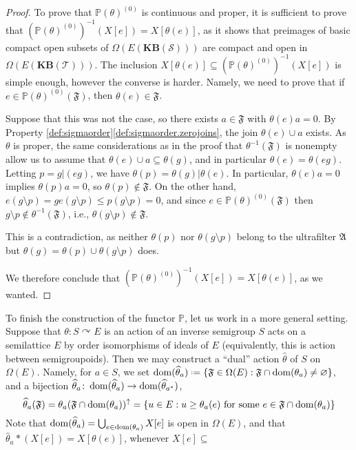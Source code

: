 \begin{proof}
    To prove that $\mathbb{P}(\theta)^{(0)}$ is continuous and proper, it is sufficient to prove that $\left(\mathbb{P}(\theta)^{(0)}\right)^{-1}(X[e])=X[\theta(e)]$, as it shows that preimages of basic compact open subsets of $\Omega(E(\mathbf{KB}(\mathcal{S})))$ are compact and open in $\Omega(E(\mathbf{KB}(\mathcal{T})))$. The inclusion $X[\theta(e)]\subseteq\left(\mathbb{P}(\theta)^{(0)}\right)^{-1}(X[e])$ is simple enough, however the converse is harder. Namely, we need to prove that if $e\in\mathbb{P}(\theta)^{(0)}(\mathfrak{F})$, then $\theta(e)\in\mathfrak{F}$.
    
    Suppose that this was not the case, so there exists $a\in\mathfrak{F}$ with $\theta(e)a=0$. By Property \ref{def:sigmaorder}\ref{def:sigmaorder.zerojoins}, the join $\theta(e)\cup a$ exists. As $\theta$ is proper, the same considerations as in the proof that $\theta^{-1}(\mathfrak{F})$ is nonempty allow us to assume that $\theta(e)\cup a\subseteq\theta(g)$, and in particular $\theta(e)=\theta(eg)$. Letting $p=g|(eg)$, we have $\theta(p)=\theta(g)|\theta(e)$. In particular, $\theta(e)a=0$ implies $\theta(p)a=0$, so $\theta(p)\not\in\mathfrak{F}$. On the other hand, $e(g\setminus p)=ge(g\setminus p)\leq p(g\setminus p)=0$, and since $e\in\mathbb{P}(\theta)^{(0)}(\mathfrak{F})$ then $g\setminus p\not\in\theta^{-1}(\mathfrak{F})$, i.e., $\theta(g\setminus p)\not\in\mathfrak{F}$.
    
    This is a contradiction, as neither $\theta(p)$ nor $\theta(g\setminus p)$ belong to the ultrafilter $\mathfrak{A}$ but $\theta(g)=\theta(p)\cup\theta(g\setminus p)$ does.
    
    We therefore conclude that $\left(\mathbb{P}(\theta)^{(0)}\right)^{-1}(X[e])=X[\theta(e)]$, as we wanted.\qedhere
\end{proof}

To finish the construction of the functor $\mathbb{P}$, let us work in a more general setting. Suppose that $\theta\colon S\curvearrowright E$ is an action of an inverse semigroup $S$ acts on a semilattice $E$ by order isomorphisms of ideals of $E$ (equivalently, this is action between semigroupoids). Then we may construct a ``dual'' action $\widehat{\theta}$ of $S$ on $\Omega(E)$. Namely, for $a\in S$, we set $\dom(\widehat{\theta}_a)\defeq\left\{\mathfrak{F}\in\Omega(E):\mathfrak{F}\cap\dom(\theta_a)\neq\varnothing\right\}$, and a bijection $\widehat{\theta}_a\colon\operatorname{dom}(\widehat{\theta}_a)\to\operatorname{dom}(\widehat{\theta}_{a^*})$, \[\widehat{\theta}_a(\mathfrak{F})=\theta_a(\mathfrak{F}\cap\operatorname{dom}(\theta_a))^{\uparrow}=\left\{u\in E:u\geq\theta_a(e)\text{ for some }e\in\mathfrak{F}\cap\operatorname{dom}(\theta_a)\right\}\]
Note that $\operatorname{dom}(\widehat{\theta}_a)=\bigcup_{e\in\operatorname{dom}(\theta_a)}X[e]$ is open in $\Omega(E)$, and that $\widehat{\theta}_a*(X[e])=X[\theta(e)]$, whenever $X[e]\subseteq$

